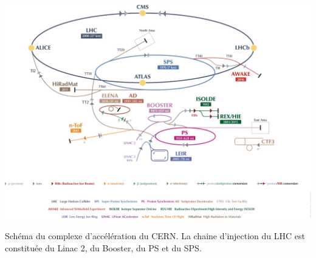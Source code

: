 \vspace{1cm}
\begin{minipagewithmarginpars}[ht!]{0.95\textwidth}
	\vspace*{0.5cm}
  	\centering
	\includegraphics[scale=0.40]{LHC/complexe.png}
  	\captionsetup{type=figure}\caption{Schéma du complexe d'accélération du CERN. La chaine d'injection du LHC est constituée du Linac \num{2}, du Booster, du PS et du SPS.}
  	\label{complexe}
  	\par 		
\end{minipagewithmarginpars}

